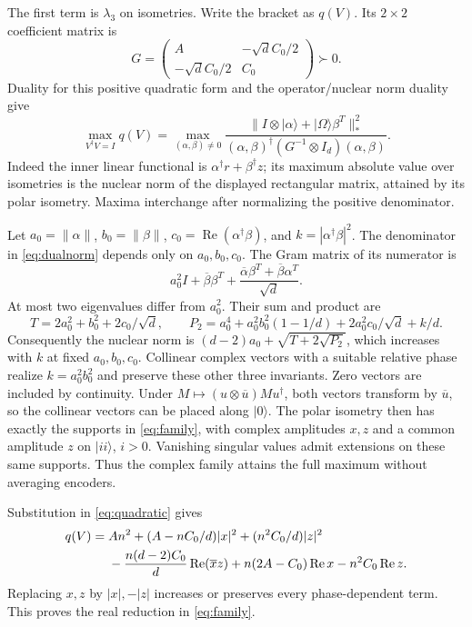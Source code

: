 \documentclass[11pt]{article}
\newcommand{\ket}[1]{\lvert#1\rangle}
\newcommand{\norm}[1]{\lVert#1\rVert}
\begin{document}
The first term is $\lambda_3$ on isometries. Write the bracket as $q(V)$.
Its $2\times2$ coefficient matrix is
\[
 G=\begin{pmatrix}A&-\sqrt d C_0/2\\-\sqrt d C_0/2&C_0\end{pmatrix}\succ0.
\]
Duality for this positive quadratic form and the operator/nuclear norm
duality give
\begin{equation}\label{eq:dualnorm}
 \max_{V^\dagger V=I}q(V)=
 \max_{(\alpha,\beta)\ne0}
 \frac{\norm{I\otimes\ket\alpha+\ket\Omega\beta^T}_*^2}
 {(\alpha,\beta)^\dagger(G^{-1}\otimes I_d)(\alpha,\beta)}.
\end{equation}
Indeed the inner linear functional is
$\alpha^\dagger r+\beta^\dagger z$; its maximum absolute value over isometries is the
nuclear norm of the displayed rectangular matrix, attained by its polar
isometry. Maxima interchange after normalizing the positive denominator.

Let $a_0=\norm\alpha$, $b_0=\norm\beta$,
$c_0=\operatorname{Re}(\alpha^\dagger\beta)$, and
$k=|\alpha^\dagger\beta|^2$. The denominator in \eqref{eq:dualnorm}
depends only on $a_0,b_0,c_0$. The Gram matrix of its numerator is
\[
 a_0^2 I+\overline\beta\beta^T+
 \frac{\overline\alpha\beta^T+\overline\beta\alpha^T}{\sqrt d}.
\]
At most two eigenvalues differ from $a_0^2$. Their sum and product are
\[
 T=2a_0^2+b_0^2+2c_0/\sqrt d,\qquad
 P_2=a_0^4+a_0^2b_0^2(1-1/d)+2a_0^2c_0/\sqrt d+k/d.
\]
Consequently the nuclear norm is
$(d-2)a_0+\sqrt{T+2\sqrt{P_2}}$, which increases with $k$ at fixed
$a_0,b_0,c_0$. Collinear complex vectors with a suitable relative phase
realize $k=a_0^2b_0^2$ and preserve these other three invariants.
Zero vectors are included by continuity. Under
$M\mapsto(u\otimes\overline u)Mu^\dagger$, both vectors transform by
$\overline u$, so the collinear vectors can be placed along $\ket0$.
The polar isometry then has exactly the supports in \eqref{eq:family},
with complex amplitudes $x,z$ and a common amplitude $z$ on $\ket{ii}$,
$i>0$. Vanishing singular values admit extensions on these same supports.
Thus the complex family attains the full maximum without averaging encoders.

Substitution in \eqref{eq:quadratic} gives
\begin{align}
 q(V)={}&An^2+(A-nC_0/d)|x|^2+(n^2C_0/d)|z|^2\notag\\
 &-\frac{n(d-2)C_0}{d}\operatorname{Re}(\overline xz)
 +n(2A-C_0)\operatorname{Re}x-n^2C_0\operatorname{Re}z.\label{eq:phases}
\end{align}
Replacing $x,z$ by $|x|,-|z|$ increases or preserves every phase-dependent
term. This proves the real reduction in \eqref{eq:family}.
\end{document}
